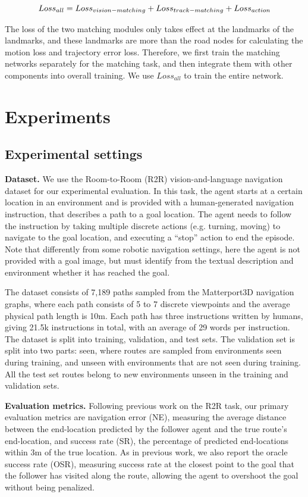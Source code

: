 \begin{equation}
	\centering
	{Loss}_{all} = {Loss}_{vision-matching} + {Loss}_{track-matching} + {Loss}_{action}
\end{equation}

The loss of the two matching modules only takes effect at the landmarks of the landmarks, and these landmarks are more than the road nodes for calculating the motion loss and trajectory error loss. Therefore, we first train the matching networks separately for the matching task, and then integrate them with other components into overall training. We use ${Loss}_{all}$ to train the entire network.

\section{Experiments}
	
\subsection{Experimental settings}
	
\textbf{Dataset.} We use the Room-to-Room (R2R) vision-and-language navigation dataset for our experimental evaluation. In this task, the agent starts at a certain location in an environment and is provided with a human-generated navigation instruction, that describes a path to a goal location. The agent needs to follow the instruction by taking multiple discrete actions (e.g. turning, moving) to navigate to the goal location, and executing a “stop” action to end the episode. Note that differently from some robotic navigation settings, here the agent is not provided with a goal image, but must identify from the textual description and environment whether it has reached the goal.
	
The dataset consists of 7,189 paths sampled from the Matterport3D navigation graphs, where each path consists of 5 to 7 discrete viewpoints and the average physical path length is 10m. Each path has three instructions written by humans, giving 21.5k instructions in total, with an average of 29 words per instruction. The dataset is split into training, validation, and test sets. The validation set is split into two parts: seen, where routes are sampled from environments seen during training, and unseen with environments that are not seen during training. All the test set routes belong to new environments unseen in the training and validation sets.

\textbf{Evaluation metrics.} Following previous work on the R2R task, our primary evaluation metrics are navigation error (NE), measuring the average distance between the end-location predicted by the follower agent and the true route’s end-location, and success rate (SR), the percentage of predicted end-locations within 3m of the true location. As in previous work, we also report the oracle success rate (OSR), measuring success rate at the closest point to the goal that the follower has visited along the route, allowing the agent to overshoot the goal without being penalized.

